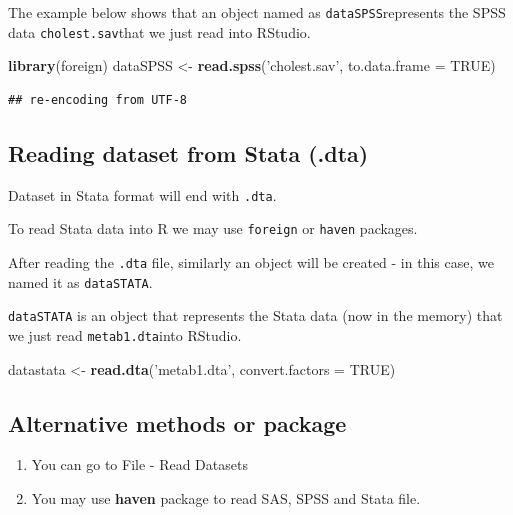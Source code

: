 \documentclass[]{book}
\newenvironment{Shaded}{\begin{snugshade}}{\end{snugshade}}
\newcommand{\KeywordTok}[1]{\textcolor[rgb]{0.13,0.29,0.53}{\textbf{#1}}}
\newcommand{\DataTypeTok}[1]{\textcolor[rgb]{0.13,0.29,0.53}{#1}}
\newcommand{\StringTok}[1]{\textcolor[rgb]{0.31,0.60,0.02}{#1}}
\newcommand{\OtherTok}[1]{\textcolor[rgb]{0.56,0.35,0.01}{#1}}
\newcommand{\NormalTok}[1]{#1}
\providecommand{\tightlist}{%
  \setlength{\itemsep}{0pt}\setlength{\parskip}{0pt}}
\theoremstyle{definition}
\theoremstyle{definition}
\theoremstyle{remark}
\begin{document}
The example below shows that an object named as
\texttt{dataSPSS}represents the SPSS data \texttt{cholest.sav}that we
just read into RStudio.

\begin{Shaded}
\begin{Highlighting}[]
\KeywordTok{library}\NormalTok{(foreign)}
\NormalTok{dataSPSS <-}\StringTok{ }\KeywordTok{read.spss}\NormalTok{(}\StringTok{'cholest.sav'}\NormalTok{, }\DataTypeTok{to.data.frame =} \OtherTok{TRUE}\NormalTok{)}
\end{Highlighting}
\end{Shaded}

\begin{verbatim}
## re-encoding from UTF-8
\end{verbatim}

\subsection{Reading dataset from Stata
(.dta)}\label{reading-dataset-from-stata-.dta}

Dataset in Stata format will end with \texttt{.dta}.

To read Stata data into R we may use \texttt{foreign} or \texttt{haven}
packages.

After reading the \texttt{.dta} file, similarly an object will be
created - in this case, we named it as \texttt{dataSTATA}.

\texttt{dataSTATA} is an object that represents the Stata data (now in
the memory) that we just read \texttt{metab1.dta}into RStudio.

\begin{Shaded}
\begin{Highlighting}[]
\NormalTok{datastata <-}\StringTok{ }\KeywordTok{read.dta}\NormalTok{(}\StringTok{'metab1.dta'}\NormalTok{, }\DataTypeTok{convert.factors =} \OtherTok{TRUE}\NormalTok{)}
\end{Highlighting}
\end{Shaded}

\subsection{Alternative methods or
package}\label{alternative-methods-or-package}

\begin{enumerate}
\def\labelenumi{\arabic{enumi}.}
\tightlist
\item
  You can go to File - Read Datasets
\item
  You may use \textbf{haven} package to read SAS, SPSS and Stata file.
\end{enumerate}
\end{document}
